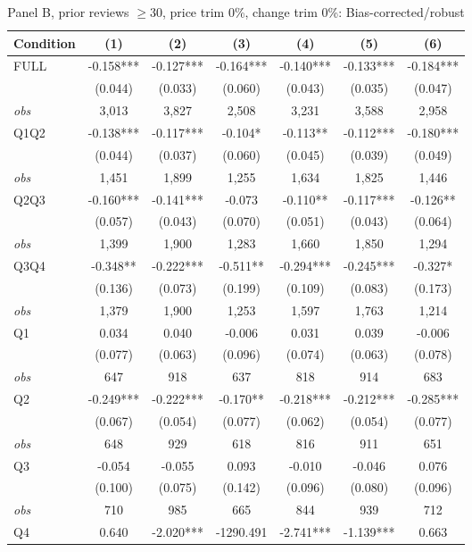 \begin{table}[!htbp]
\centering
\caption{Panel B, prior reviews $\geq 30$, price trim 0\%, change trim 0\%: Bias-corrected/robust}
\label{tab:b:trim00:reviews30:robust}
\small
\begin{tabular}{lcccccc}
\toprule
Condition & (1) & (2) & (3) & (4) & (5) & (6) \\
\midrule
FULL & -0.158*** & -0.127*** & -0.164*** & -0.140*** & -0.133*** & -0.184*** \\
 & (0.044) & (0.033) & (0.060) & (0.043) & (0.035) & (0.047) \\
\textit{obs} & 3,013 & 3,827 & 2,508 & 3,231 & 3,588 & 2,958 \\
Q1Q2 & -0.138*** & -0.117*** & -0.104* & -0.113** & -0.112*** & -0.180*** \\
 & (0.044) & (0.037) & (0.060) & (0.045) & (0.039) & (0.049) \\
\textit{obs} & 1,451 & 1,899 & 1,255 & 1,634 & 1,825 & 1,446 \\
Q2Q3 & -0.160*** & -0.141*** & -0.073 & -0.110** & -0.117*** & -0.126** \\
 & (0.057) & (0.043) & (0.070) & (0.051) & (0.043) & (0.064) \\
\textit{obs} & 1,399 & 1,900 & 1,283 & 1,660 & 1,850 & 1,294 \\
Q3Q4 & -0.348** & -0.222*** & -0.511** & -0.294*** & -0.245*** & -0.327* \\
 & (0.136) & (0.073) & (0.199) & (0.109) & (0.083) & (0.173) \\
\textit{obs} & 1,379 & 1,900 & 1,253 & 1,597 & 1,763 & 1,214 \\
Q1 & 0.034 & 0.040 & -0.006 & 0.031 & 0.039 & -0.006 \\
 & (0.077) & (0.063) & (0.096) & (0.074) & (0.063) & (0.078) \\
\textit{obs} & 647 & 918 & 637 & 818 & 914 & 683 \\
Q2 & -0.249*** & -0.222*** & -0.170** & -0.218*** & -0.212*** & -0.285*** \\
 & (0.067) & (0.054) & (0.077) & (0.062) & (0.054) & (0.077) \\
\textit{obs} & 648 & 929 & 618 & 816 & 911 & 651 \\
Q3 & -0.054 & -0.055 & 0.093 & -0.010 & -0.046 & 0.076 \\
 & (0.100) & (0.075) & (0.142) & (0.096) & (0.080) & (0.096) \\
\textit{obs} & 710 & 985 & 665 & 844 & 939 & 712 \\
Q4 & 0.640 & -2.020*** & -1290.491 & -2.741*** & -1.139*** & 0.663 \\

\end{tabular}
\end{table}
